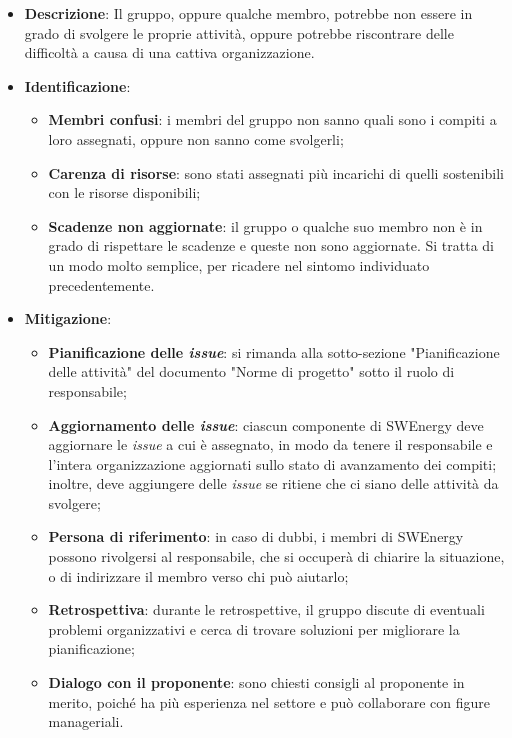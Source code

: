 \label{risk:organizzazione carente}
\begin{itemize}
	\item \textbf{Descrizione}:
	      Il gruppo, oppure qualche membro, potrebbe non essere in grado di
	      svolgere le proprie attività, oppure potrebbe riscontrare delle
	      difficoltà a causa di una cattiva organizzazione.
	\item \textbf{Identificazione}:
	      \begin{itemize}
		      \item \textbf{Membri confusi}: i membri del gruppo non sanno quali
		            sono i compiti a loro assegnati, oppure non sanno come
		            svolgerli;

		      \item \textbf{Carenza di risorse}: sono stati assegnati più
		            incarichi di quelli sostenibili con le risorse disponibili;

		      \item \textbf{Scadenze non aggiornate}: il gruppo o qualche suo
		            membro non è in grado di rispettare le scadenze e queste non
		            sono aggiornate. Si tratta di un modo molto semplice, per
		            ricadere nel sintomo individuato precedentemente.
	      \end{itemize}

	\item \textbf{Mitigazione}:
	      \begin{itemize}
		      \item \textbf{Pianificazione delle \textit{issue}}: si rimanda
		            alla sotto-sezione "Pianificazione delle attività" del
		            documento "Norme di progetto" sotto il ruolo di
		            responsabile;

		      \item \textbf{Aggiornamento delle \textit{issue}}:
		            ciascun componente di SWEnergy deve aggiornare le
		            \textit{issue} a cui è assegnato, in modo da tenere il
		            responsabile e l'intera organizzazione aggiornati sullo
		            stato di avanzamento dei compiti; inoltre, deve aggiungere
		            delle \textit{issue} se ritiene che ci siano delle attività
		            da svolgere;

		      \item \textbf{Persona di riferimento}: in caso di dubbi, i
		            membri di SWEnergy possono rivolgersi
		            al responsabile, che si occuperà di chiarire la situazione,
		            o di indirizzare il membro verso chi può aiutarlo;

		      \item \textbf{Retrospettiva}: durante le retrospettive, il gruppo
		            discute di eventuali problemi organizzativi e cerca di
		            trovare soluzioni per migliorare la pianificazione;

		      \item \textbf{Dialogo con il proponente}: sono chiesti consigli al
		            proponente in merito, poiché ha più esperienza nel settore e 
					può collaborare con figure manageriali.
	      \end{itemize}
\end{itemize}
